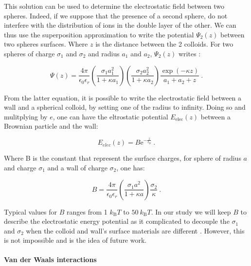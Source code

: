 This solution can be used to determine the  electrostatic field between two spheres. Indeed, if we suppose that the presence of a second sphere, do not interfere with the distribution of ions in the double layer of the other. We can thus use the superposition approximation to write the potential $\Psi _2 (z)$ between two spheres surfaces. Where $z$ is the distance between the 2 colloids. For two spheres of charge $\sigma_1$ and $\sigma_2$ and radius $a_1$ and $a_2$, $\Psi_2 (z)$ writes \cite{bell_approximate_1970}:

\begin{equation}
	\Psi(z) = \frac{4\pi}{\epsilon_0 \epsilon_r} 
	\left(
	\frac{\sigma_1 a_1 ^2}{1 + \kappa a_1}
	\right)
	\left(
	\frac{\sigma_2 a_2 ^2}{1 + \kappa a_2}
	\right)
	\frac{\exp(-\kappa z)}{a_1 + a_2 + z} ~.
\end{equation} 

From the latter equation, it is possible to write the electrostatic field between a wall and a spherical colloid, by setting one of the radius to infinity. Doing so and mulitplying by $e$, one can have the eltrostatic potential $E_\mathrm{elec}(z)$ between a Brownian particle and the wall:

\begin{equation}
	E_{elec} (z) = B \mathrm{e}^{-\frac{z}{\ell_\mathrm{D}}}~.
\end{equation}

Where B is the constant that represent the surface charges, for sphere of radius $a$ and charge $\sigma_1$ and a wall of charge $\sigma_2$, one has:

\begin{equation}
	B = \frac{4 \pi}{\epsilon_0 \epsilon_r} \left( \frac{\sigma_1 a^2 }{1 + \kappa a}  \right) \frac{\sigma_2}{\kappa} ~.
\end{equation}

Typical values for $B$ ranges from 1 $k_\mathrm{B}T$ to $50 ~ k_\mathrm{B}T$. In our study we will keep $B$ to describe the electrostatic energy potential as it complicated to decouple the $\sigma_1$ and $\sigma_2$ when the colloid and wall's surface materials are different \cite{behrens_charge_2001}. However, this is not impossible and is the idea of future work.

\paragraph{Van der Waals interactions}\mbox{}\\
\vspace{0.10cm}

